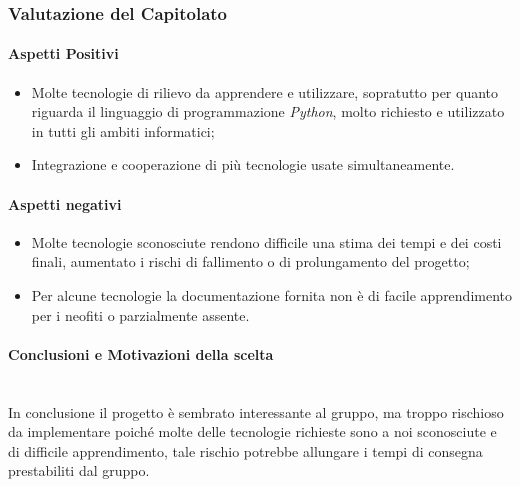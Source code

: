\subsubsection{Valutazione del Capitolato}

\paragraph{Aspetti Positivi}
\begin{itemize}
	\item Molte tecnologie di rilievo da apprendere e utilizzare, sopratutto per quanto riguarda il linguaggio di programmazione \textit{Python}, molto richiesto e utilizzato in tutti gli ambiti informatici;
	\item Integrazione e cooperazione di più tecnologie usate simultaneamente. 
\end{itemize}

\paragraph{Aspetti negativi}
\begin{itemize}
	\item Molte tecnologie sconosciute rendono difficile una stima dei tempi e dei costi finali, aumentato i rischi di fallimento o di prolungamento del progetto; 
	\item Per alcune tecnologie la documentazione fornita non è di facile apprendimento per i neofiti o parzialmente assente. 
\end{itemize}


\paragraph{Conclusioni e Motivazioni della scelta}\-\\
In conclusione il progetto è sembrato interessante al gruppo, ma troppo rischioso da implementare poiché molte delle tecnologie richieste sono a noi sconosciute e di difficile apprendimento, tale rischio potrebbe allungare i tempi di consegna prestabiliti dal gruppo.  

